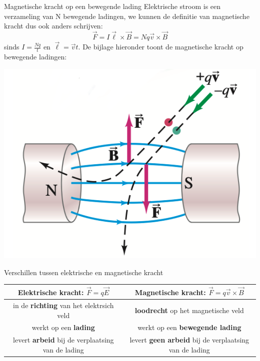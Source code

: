 \begin{theo}{Magnetische kracht op een bewegende lading}
    Elektrische stroom is een verzameling van N bewegende ladingen, we kunnen de definitie van magnetische kracht dus ook anders schrijven:
    \begin{equation*}
        \Vec{F} = I\Vec{\ell} \times \Vec{B} = Nq\Vec{v} \times \Vec{B}
    \end{equation*}
    sinds $I = \tfrac{Nq}{t}$ en $\Vec{\ell} = \Vec{v}t$. De bijlage hieronder toont de magnetische kracht op bewegende ladingen:
    \begin{center}
        \includegraphics[scale=0.25]{Images/Magnetisme/MagnetischeKrachtOpBewgendeLading}
    \end{center}
\end{theo}

\begin{vrg}{Verschillen tussen elektrische en magnetische kracht}
    \vspace{-0.3cm}
    \def\arraystretch{2}
    \hspace{-0.35cm}
    \begin{tabular}{c|c}
        Elektrische kracht: $\Vec{F} = q\Vec{E}$ & Magnetische kracht: $\Vec{F} = q\Vec{v} \times \Vec{B}$ \\ \hline
        in de \textbf{richting} van het elektrsich veld & \textbf{loodrecht} op het magnetische veld \\
        werkt op een \textbf{lading} & werkt op een \textbf{bewegende lading} \\
        levert \textbf{arbeid} bij de verplaatsing van de lading & levert \textbf{geen arbeid} bij de verplaatsing van de lading \\
    \end{tabular}
\end{vrg}

